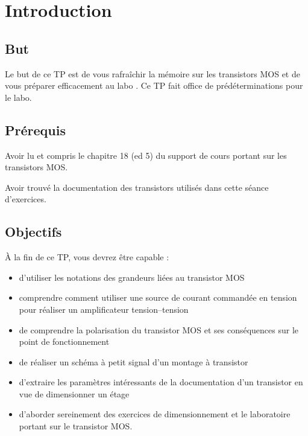 \documentclass{../template/tp}
\author{The Fantastic Four}
\begin{document}
\section{Introduction}
\subsection{But}
Le but de ce TP est de vous rafraîchir la mémoire sur les transistors MOS et de vous préparer efficacement au labo . Ce TP fait office de prédéterminations pour le labo.
\subsection{Prérequis}
Avoir lu et compris le chapitre 18 (ed 5) du support de cours portant sur les transistors MOS.

Avoir trouvé la documentation des transistors utilisés dans cette séance d'exercices.

\subsection{Objectifs}
À la fin de ce TP, vous devrez être capable :
\begin{itemize}
\item d'utiliser les notations des grandeurs liées au transistor MOS
\item comprendre comment utiliser une source de courant commandée en tension pour réaliser un amplificateur tension--tension
\item de comprendre la polarisation du transistor MOS et ses conséquences sur le point de fonctionnement %
\item de réaliser un schéma à petit signal d'un montage à transistor
\item d'extraire les paramètres intéressants de la documentation d'un transistor en vue de dimensionner un étage
\item d'aborder sereinement des exercices de dimensionnement et le laboratoire portant sur le transistor MOS.
\end{itemize}
\end{document}
